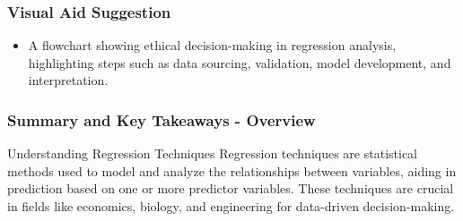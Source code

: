 \documentclass[aspectratio=169]{beamer}
\begin{document}
\begin{frame}[fragile]
    \frametitle{Visual Aid Suggestion}
    \begin{itemize}
        \item A flowchart showing ethical decision-making in regression analysis, highlighting steps such as data sourcing, validation, model development, and interpretation. 
    \end{itemize}
\end{frame}

\begin{frame}[fragile]
    \frametitle{Summary and Key Takeaways - Overview}
    \begin{block}{Understanding Regression Techniques}
        Regression techniques are statistical methods used to model and analyze the relationships between variables, aiding in prediction based on one or more predictor variables. These techniques are crucial in fields like economics, biology, and engineering for data-driven decision-making.
    \end{block}
\end{frame}
\end{document}
